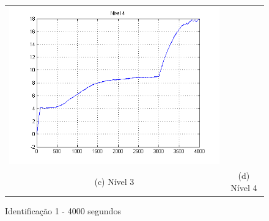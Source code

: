 \begin{figure}[H]
\begin{tabular}{cc}
		\includegraphics[height=0.15\paperheight,keepaspectratio]{img/sim1_h4.png} \\
		(c) Nível 3 &
		(d) Nível 4
	\end{tabular}
	\caption{\label{imgID_4000} Identificação 1 - 4000 segundos}
\end{figure}

